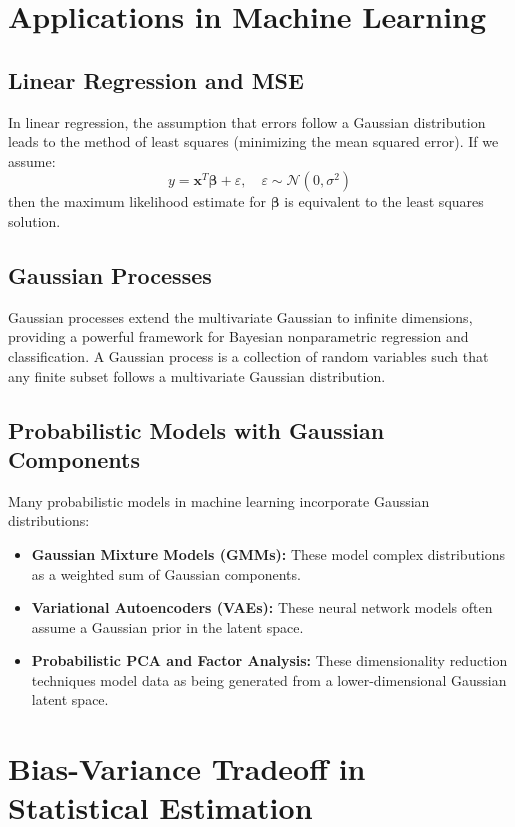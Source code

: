 \documentclass{article}
\begin{document}
\section{Applications in Machine Learning}

\subsection{Linear Regression and MSE}

In linear regression, the assumption that errors follow a Gaussian distribution leads to the method of least squares (minimizing the mean squared error). If we assume:
\[
y = \mathbf{x}^T\boldsymbol{\beta} + \varepsilon, \quad \varepsilon \sim \mathcal{N}(0, \sigma^2)
\]
then the maximum likelihood estimate for $\boldsymbol{\beta}$ is equivalent to the least squares solution.

\subsection{Gaussian Processes}

Gaussian processes extend the multivariate Gaussian to infinite dimensions, providing a powerful framework for Bayesian nonparametric regression and classification. A Gaussian process is a collection of random variables such that any finite subset follows a multivariate Gaussian distribution.

\subsection{Probabilistic Models with Gaussian Components}

Many probabilistic models in machine learning incorporate Gaussian distributions:

\begin{itemize}
\item \textbf{Gaussian Mixture Models (GMMs):} These model complex distributions as a weighted sum of Gaussian components.
\item \textbf{Variational Autoencoders (VAEs):} These neural network models often assume a Gaussian prior in the latent space.
\item \textbf{Probabilistic PCA and Factor Analysis:} These dimensionality reduction techniques model data as being generated from a lower-dimensional Gaussian latent space.
\end{itemize}

\section{Bias-Variance Tradeoff in Statistical Estimation}
\end{document}
